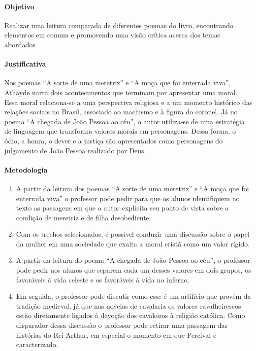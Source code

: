 \documentclass[12pt]{extarticle}
\begin{document}
\paragraph{Objetivo} Realizar uma leitura comparada de diferentes poemas do
livro, encontrando elementos em comum e promovendo uma visão crítica acerca dos
temas abordados.

\paragraph{Justificativa} Nos poemas ``A sorte de uma meretriz'' e ``A moça que
foi enterrada viva'', Athayde narra dois acontecimentos que terminam por
apresentar uma moral. Essa moral relaciona-se a uma perspectiva religiosa
e a um momento histórico das relações sociais no Brasil, associado ao machismo
e à figura do coronel. Já no poema ``A chegada de João Pessoa ao céu'', o autor
utiliza-se de uma estratégia de linguagem que transforma valores morais em
personagens. Dessa forma, o ódio, a honra, o dever e a justiça são apresentados
como personagens do julgamento de João Pessoa realizado por Deus. 

\paragraph{Metodologia}

\begin{enumerate}

\item A partir da leitura dos poemas ``A sorte de uma meretriz'' e ``A moça que
  foi enterrada viva'' o professor pode pedir para que os alunos identifiquem
  no texto as passagens em que o autor explicita seu ponto de vista sobre
  a condição de meretriz e de filha desobediente. 

\item Com os trechos selecionados, é possível conduzir uma discussão sobre
  o papel da mulher em uma sociedade que exalta a moral cristã como um valor
  rígido.

\item A partir da leitura do poema ``A chegada de João Pessoa ao céu'',
  o professor pode pedir aos alunos que separem cada um desses valores em dois
  grupos, os favoráveis à vida celeste e os favoráveis à vida no inferno. 

\item Em seguida, o professor pode discutir como esse é um artifício que provém
  da tradição medieval, já que nas novelas de cavalaria os valores
  cavalheirescos estão diretamente ligados à devoção dos cavaleiros à religião
  católica.  Como disparador dessa discussão o professor pode retirar uma
  passagem das histórias do Rei Arthur, em especial o momento em que Percival
  é caracterizado.

\end{enumerate}
\end{document}
